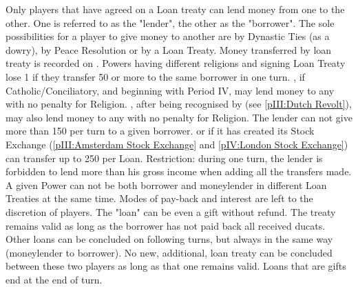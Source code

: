 \label{chDiplo:Alliance:Loan Treaty}
Only players that have agreed on a Loan treaty can lend money from one to the
other. One is referred to as the "lender", the other as the "borrower".
\bparag The sole possibilities for a player to give money to another are by
Dynastic Ties (as a dowry), by Peace Resolution or by a Loan Treaty.%
\bparag Money transferred by loan treaty is recorded on .
\bparag Powers having different religions and signing Loan Treaty lose 1 \STAB
if they transfer 50 \ducats or more to the same borrower in one turn.
\bparag[Exceptions.] \FRA, if Catholic/Conciliatory, and \ENG beginning with
Period IV, may lend money to any \MAJ with no penalty for Religion. \HOL,
after being recognised by \SPA (see \ref{pIII:Dutch Revolt}), may also lend
money to any \MAJ with no penalty for Religion.
\bparag The lender can not give more than 150 \ducats per turn to a given
borrower. %
\bparag[Exception.] \HOL or \ENG if it has created its Stock Exchange
(\ref{pIII:Amsterdam Stock Exchange} and \ref{pIV:London Stock Exchange}) can
transfer up to 250 \ducats per Loan.
\bparag Restriction: during one turn, the lender is forbidden to lend more
than his gross income when adding all the transfers made.
\bparag A given Power can not be both borrower and moneylender in different
Loan Treaties at the same time.
\bparag Modes of pay-back and interest are left to the discretion of
players. The "loan" can be even a gift without refund.
\bparag The treaty remains valid as long as the borrower has not paid back all
received ducats. Other loans can be concluded on following turns, but always
in the same way (moneylender to borrower). No new, additional, loan treaty can
be concluded between these two players as long as that one remains valid.
Loans that are gifts end at the end of turn.
